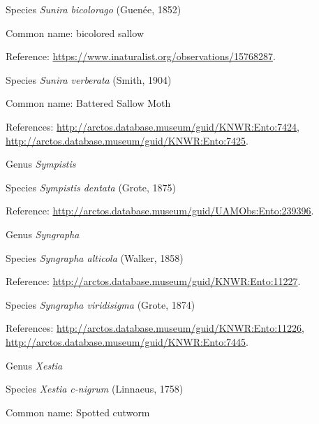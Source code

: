 \documentclass[9pt, article]{memoir}
\begin{document}
\begin{multicols}{2}
\vspace{6pt}\noindent\hspace{36pt}Species \textit{Sunira bicolorago} (Guenée, 1852)


Common name: bicolored sallow

Reference: 
\url{https://www.inaturalist.org/observations/15768287}.

\vspace{6pt}\noindent\hspace{36pt}Species \textit{Sunira verberata} (Smith, 1904)


Common name: Battered Sallow Moth

References: 
\url{http://arctos.database.museum/guid/KNWR:Ento:7424}, 
\url{http://arctos.database.museum/guid/KNWR:Ento:7425}.

\vspace{6pt}\noindent\hspace{30pt}Genus \textit{Sympistis}


\vspace{6pt}\noindent\hspace{36pt}Species \textit{Sympistis dentata} (Grote, 1875)


Reference: 
\url{http://arctos.database.museum/guid/UAMObs:Ento:239396}.

\vspace{6pt}\noindent\hspace{30pt}Genus \textit{Syngrapha}


\vspace{6pt}\noindent\hspace{36pt}Species \textit{Syngrapha alticola} (Walker, 1858)


Reference: 
\url{http://arctos.database.museum/guid/KNWR:Ento:11227}.

\vspace{6pt}\noindent\hspace{36pt}Species \textit{Syngrapha viridisigma} (Grote, 1874)


References: 
\url{http://arctos.database.museum/guid/KNWR:Ento:11226}, 
\url{http://arctos.database.museum/guid/KNWR:Ento:7445}.

\vspace{6pt}\noindent\hspace{30pt}Genus \textit{Xestia}


\vspace{6pt}\noindent\hspace{36pt}Species \textit{Xestia c-nigrum} (Linnaeus, 1758)


Common name: Spotted cutworm


\end{multicols}
\end{document}
